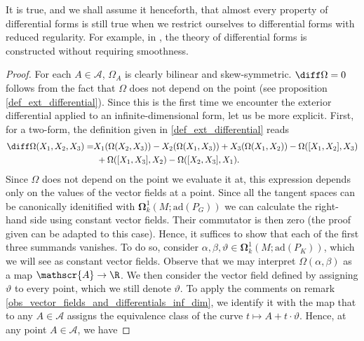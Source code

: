 {\begin{obs}
    It is true, and we shall assume it henceforth, that almost every property of differential forms is still true when we restrict ourselves to differential forms with reduced regularity. For example, in \parencite{SergeLang}, the theory of differential forms is constructed without requiring smoothness.
\end{obs}

\begin{proof}
    For each \(A \in \mathscr{A}\), \(\Omega_A\) is clearly bilinear and skew-symmetric. \(\diff \Omega=0\) follows from the fact that \(\Omega\) does not depend on the point (see proposition \ref{def_ext_differential}). Since this is the first time we encounter the exterior differential applied to an infinite-dimensional form, let us be more explicit. First, for a two-form, the definition given in \eqref{def_ext_differential} reads
    \begin{align*}
        \diff \Omega(X_1, X_2, X_3)  = & X_1(\Omega(X_2, X_3)) - X_2(\Omega(X_1, X_3))+X_3(\Omega(X_1, X_2)) - \Omega([X_1, X_2], X_3) \\
        & \ + \Omega([X_1, X_3], X_2) - \Omega([X_2, X_3], X_1).
    \end{align*}    
    Since \(\Omega\) does not depend on the point we evaluate it at, this expression depends only on the values of the vector fields at a point. Since all the tangent spaces can be canonically idenitified with \(\bm{\Omega}_k^1(M; \mathrm{ad}(P_G))\) we can calculate the right-hand side using constant vector fields. Their commutator is then zero (the proof given \parencite[Prop. 2.6]{LarsMartin_Notes_HK} can be adapted to this case). Hence, it suffices to show that each of the first three summands vanishes. To do so, consider \(\alpha, \beta ,\vartheta \in \bm{\Omega}_k^1(M; \mathrm{ad}(P_K))\), which we will see as constant vector fields. Observe that we may interpret \(\Omega(\alpha, \beta)\) as a map \(\mathscr{A} \to \R\). We then consider the vector field defined by assigning \(\vartheta\) to every point, which we still denote \(\vartheta\). To apply the comments on remark \ref{obs_vector_fields_and_differentials_inf_dim}, we identify it with the map that to any \(A \in \mathscr{A}\) assigns the equivalence class of the curve \(t \mapsto A+t \cdot \vartheta\). Hence, at any point \(A \in \mathscr{A}\), we have

\end{proof}}
